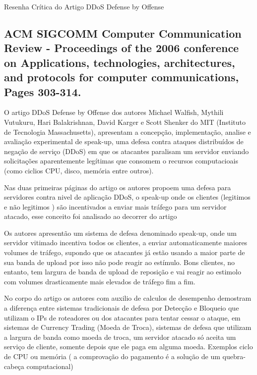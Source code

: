 \documentclass[a4paper,12pt]{article}
\begin{document}
\LARGE
Resenha Crítica do Artigo DDoS Defense by Offense
\large

\subsection*{\textbf{ACM SIGCOMM } Computer Communication Review - Proceedings of the 2006 conference on Applications, technologies, architectures, and protocols for computer communications, Pages 303-314. }

O artigo DDoS Defense by Offense \cite{Walfish:2006:DDO:1151659.1159948} dos autores Michael Walfish, Mythili Vutukuru, Hari Balakrishnan, David Karger  e  Scott Shenker do MIT (Instituto de Tecnologia Massachusetts), apresentam a concepção, implementação, analise e avaliação experimental de speak-up, uma defesa contra ataques distribuídos de negação de serviço (DDoS) em que os atacantes paralisam um servidor enviando solicitações aparentemente legítimas que consomem o recursos computacioais (como ciclios CPU, disco, memória entre outros).

\vspace{0.5cm}

Nas duas primeiras páginas do artigo os autores propoem uma defesa para servidores contra nivel de aplicação DDoS, o speak-up onde os clientes (legitimos e não legitimos ) são incentivados a enviar mais tráfego para um servidor atacado, esse conceito foi analisado ao decorrer do artigo

\vspace{0.5cm}
Os autores apresentão um sistema de defesa denominado speak-up, onde um servidor vitimado incentiva todos os clientes, a enviar automaticamente maiores volumes de tráfego, supondo que os atacantes já estão usando a maior parte de sua banda de upload por isso não pode reagir ao estímulo. Bons clientes, no entanto, tem largura de banda de upload de reposição e vai reagir ao estimolo com volumes drasticamente mais elevados de tráfego fim a fim.

\vspace{0.5cm}

No corpo do artigo os autores com auxilio de calculos de desempenho demostram  a diferença entre sistemas tradicionais de defesa por Detecção e Bloqueio que utilizam o IPs de roteadores ou dos atacantes para tentar cessar o ataque, em sistemas de Currency Trading (Moeda de Troca),  sistemas de defesa que utilizam a largura de banda como moeda de troca, um servidor atacado só aceita um serviço de cliente, somente depois que ele paga em alguma moeda. Exemplos ciclo de  CPU ou memória ( a comprovação do pagamento é a solução de um quebra-cabeça computacional)
\vspace{0.5cm}
\end{document}
